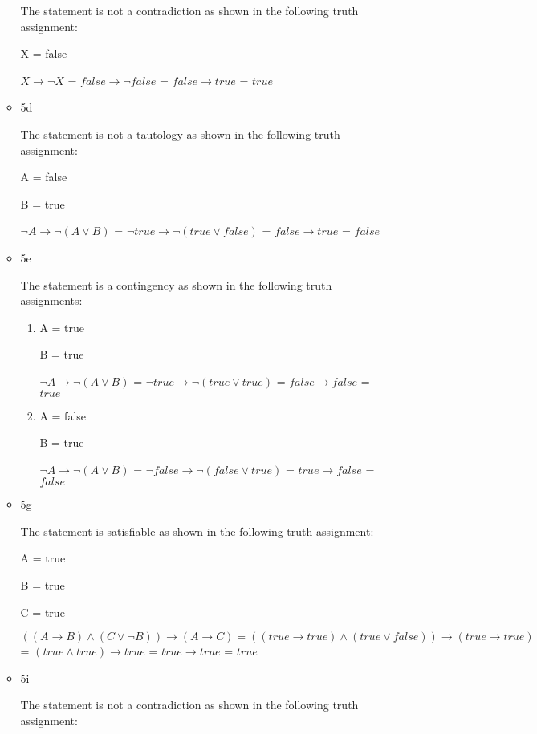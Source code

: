 \documentclass{article}
\begin{document}
\begin{itemize}
\begin{itemize}
        The statement is not a contradiction as shown in the following truth assignment:
        
        X = false

        $X \rightarrow \neg X$ = $false \rightarrow \neg false$ = $false \rightarrow true$ = $true$
        \item 5d
        
        The statement is not a tautology as shown in the following truth assignment:
        
        A = false

        B = true

        $\neg A \rightarrow \neg (A \lor B)$ = $\neg true \rightarrow \neg (true \lor false)$ = $false \rightarrow true$ = $false$
        \item 5e
        
        The statement is a contingency as shown in the following truth assignments:
        
        \begin{enumerate}
            \item
            A = true

            B = true

            $\neg A \rightarrow \neg (A \lor B)$ = $\neg true \rightarrow \neg (true \lor true)$ = $false \rightarrow false$ = $true$

            \item
            A = false

            B = true

            $\neg A \rightarrow \neg (A \lor B)$ = $\neg false \rightarrow \neg (false \lor true)$ = $true \rightarrow false$ = $false$
        \end{enumerate}
        \item 5g
        
        The statement is satisfiable as shown in the following truth assignment:
        
        A = true

        B = true

        C = true
        
        $((A \rightarrow B) \land (C \lor \neg B)) \rightarrow (A \rightarrow C) = ((true \rightarrow true) \land (true \lor false)) \rightarrow (true \rightarrow true)$ = $(true \land true) \rightarrow true$ = $true \rightarrow true$ = $true$
        \item 5i
        
        The statement is not a contradiction as shown in the following truth assignment:
        

\end{itemize}
\end{itemize}
\end{document}
